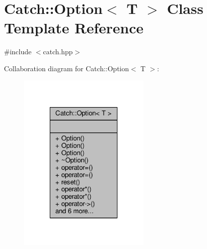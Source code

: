 \hypertarget{class_catch_1_1_option}{\section{Catch\-:\-:Option$<$ T $>$ Class Template Reference}
\label{class_catch_1_1_option}
}


{\ttfamily \#include $<$catch.\-hpp$>$}



Collaboration diagram for Catch\-:\-:Option$<$ T $>$\-:
\nopagebreak
\begin{figure}[H]
\begin{center}
\leavevmode
\includegraphics[width=180pt]{class_catch_1_1_option__coll__graph}
\end{center}
\end{figure}
